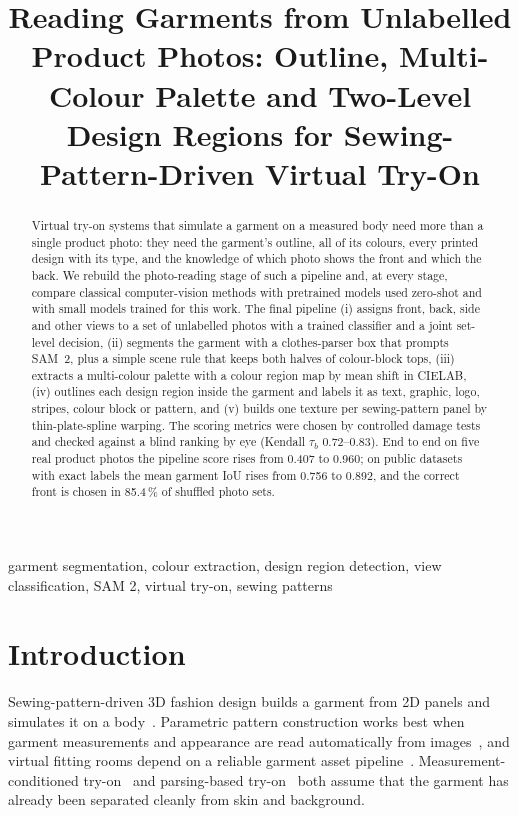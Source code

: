 \documentclass[conference]{IEEEtran}
\begin{document}
\title{Reading Garments from Unlabelled Product Photos: Outline, Multi-Colour Palette and Two-Level Design Regions for Sewing-Pattern-Driven Virtual Try-On}

\author{
}

\maketitle

\begin{abstract}
Virtual try-on systems that simulate a garment on a measured body need more than a single product photo: they need the garment's outline, all of its colours, every printed design with its type, and the knowledge of which photo shows the front and which the back. We rebuild the photo-reading stage of such a pipeline and, at every stage, compare classical computer-vision methods with pretrained models used zero-shot and with small models trained for this work. The final pipeline (i) assigns front, back, side and other views to a set of unlabelled photos with a trained classifier and a joint set-level decision, (ii) segments the garment with a clothes-parser box that prompts SAM~2, plus a simple scene rule that keeps both halves of colour-block tops, (iii) extracts a multi-colour palette with a colour region map by mean shift in CIELAB, (iv) outlines each design region inside the garment and labels it as text, graphic, logo, stripes, colour block or pattern, and (v) builds one texture per sewing-pattern panel by thin-plate-spline warping. The scoring metrics were chosen by controlled damage tests and checked against a blind ranking by eye (Kendall $\tau_b$ 0.72--0.83). End to end on five real product photos the pipeline score rises from 0.407 to 0.960; on public datasets with exact labels the mean garment IoU rises from 0.756 to 0.892, and the correct front is chosen in 85.4\,\% of shuffled photo sets.
\end{abstract}

\begin{IEEEkeywords}
garment segmentation, colour extraction, design region detection, view classification, SAM 2, virtual try-on, sewing patterns
\end{IEEEkeywords}

\section{Introduction}
Sewing-pattern-driven 3D fashion design builds a garment from 2D panels and simulates it on a body~\cite{luo2026survey}. Parametric pattern construction works best when garment measurements and appearance are read automatically from images~\cite{lyu2026review}, and virtual fitting rooms depend on a reliable garment asset pipeline~\cite{cannavo2024pipeline}. Measurement-conditioned try-on~\cite{nikolaev2026quantfit} and parsing-based try-on~\cite{kim2025capvton} both assume that the garment has already been separated cleanly from skin and background.
\end{document}
